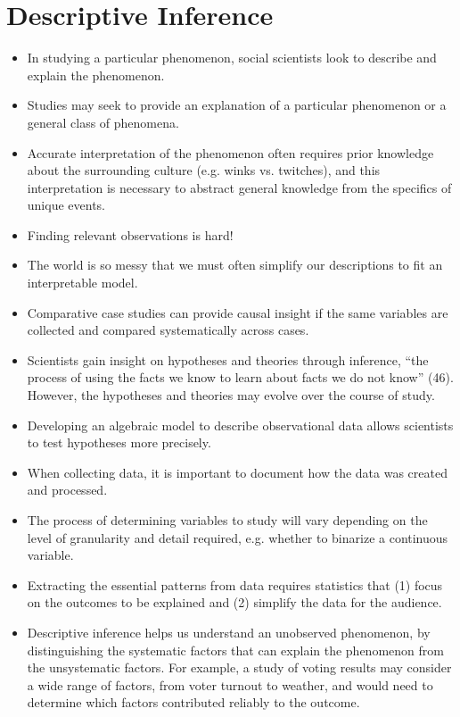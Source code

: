 \documentclass[11pt,letterpaper]{article}
\begin{document}
\section{Descriptive Inference}

\begin{itemize}
\item In studying a particular phenomenon, social scientists look to describe and explain the phenomenon.
\item Studies may seek to provide an explanation of a particular phenomenon or a general class of phenomena.
\item Accurate interpretation of the phenomenon often requires prior knowledge about the surrounding culture (e.g. winks vs. twitches), and this interpretation is necessary to abstract general knowledge from the specifics of unique events.
\item Finding relevant observations is hard!
\item The world is so messy that we must often simplify our descriptions to fit an interpretable model. 
\item Comparative case studies can provide causal insight if the same variables are collected and compared systematically across cases.
\item Scientists gain insight on hypotheses and theories through inference, ``the process of using the facts we know to learn about facts we do not know'' (46). However, the hypotheses and theories may evolve over the course of study.
\item Developing an algebraic model to describe observational data allows scientists to test hypotheses more precisely. 
\item When collecting data, it is important to document how the data was created and processed.
\item The process of determining variables to study will vary depending on the level of granularity and detail required, e.g. whether to binarize a continuous variable. 
\item Extracting the essential patterns from data requires statistics that (1) focus on the outcomes to be explained and (2) simplify the data for the audience.
\item Descriptive inference helps us understand an unobserved phenomenon, by distinguishing the systematic factors that can explain the phenomenon from the unsystematic factors. For example, a study of voting results may consider a wide range of factors, from voter turnout to weather, and would need to determine which factors contributed reliably to the outcome.

\end{itemize}
\end{document}
